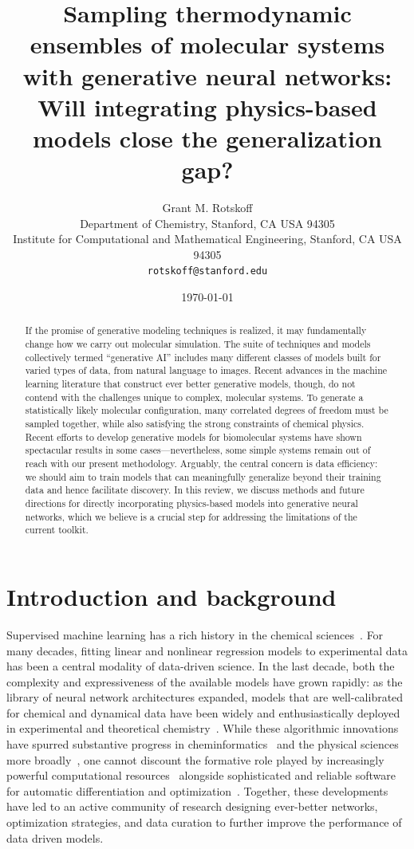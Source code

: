 \documentclass[11pt]{article}
\title{Sampling thermodynamic ensembles of molecular systems with generative neural networks: Will integrating physics-based models close the generalization gap?}
\author{Grant M. Rotskoff\\
Department of Chemistry, Stanford, CA USA 94305\\
Institute for Computational and Mathematical Engineering, Stanford, CA USA 94305\\
\texttt{rotskoff@stanford.edu}}
\date{\today}
\begin{document}
\maketitle

\begin{abstract}
If the promise of generative modeling techniques is realized, it may fundamentally change how we carry out molecular simulation.
The suite of techniques and models collectively termed ``generative AI'' includes many different classes of models built for varied types of data, from natural language to images.
Recent advances in the machine learning literature that construct ever better generative models, though, do not contend with the challenges unique to complex, molecular systems. 
To generate a statistically likely molecular configuration, many correlated degrees of freedom must be sampled together, while also satisfying the strong constraints of chemical physics. 
Recent efforts to develop generative models for biomolecular systems have shown spectacular results in some cases---nevertheless, some simple systems remain out of reach with our present methodology.
Arguably, the central concern is data efficiency: we should aim to train models that can meaningfully generalize beyond their training data and hence facilitate discovery.
In this review, we discuss methods and future directions for directly incorporating physics-based models into generative neural networks, which we believe is a crucial step for addressing the limitations of the current toolkit.
\end{abstract}


\section{Introduction and background}
\label{sec:intro}


Supervised machine learning has a rich history in the chemical sciences~\cite{lederberg_applications_1969}. 
For many decades, fitting linear and nonlinear regression models to experimental data has been a central modality of data-driven science.
In the last decade, both the complexity and expressiveness of the available models have grown rapidly: as the library of neural network architectures expanded, models that are well-calibrated for chemical and dynamical data have been widely and enthusiastically deployed in experimental and theoretical chemistry~\cite{mater_deep_2019}. 
While these algorithmic innovations have spurred substantive progress in cheminformatics~\cite{mater_deep_2019} and the physical sciences more broadly~\cite{carleo_machine_2019}, one cannot discount the formative role played by increasingly powerful computational resources~\cite{amodei_ai_2018} alongside sophisticated and reliable software for automatic differentiation and optimization~\cite{paszke_pytorch_2019, bradbury_jax_2018, broughton_tensorflow_2020}. 
Together, these developments have led to an active community of research designing ever-better networks, optimization strategies, and data curation to further improve the performance of data driven models.
\end{document}

